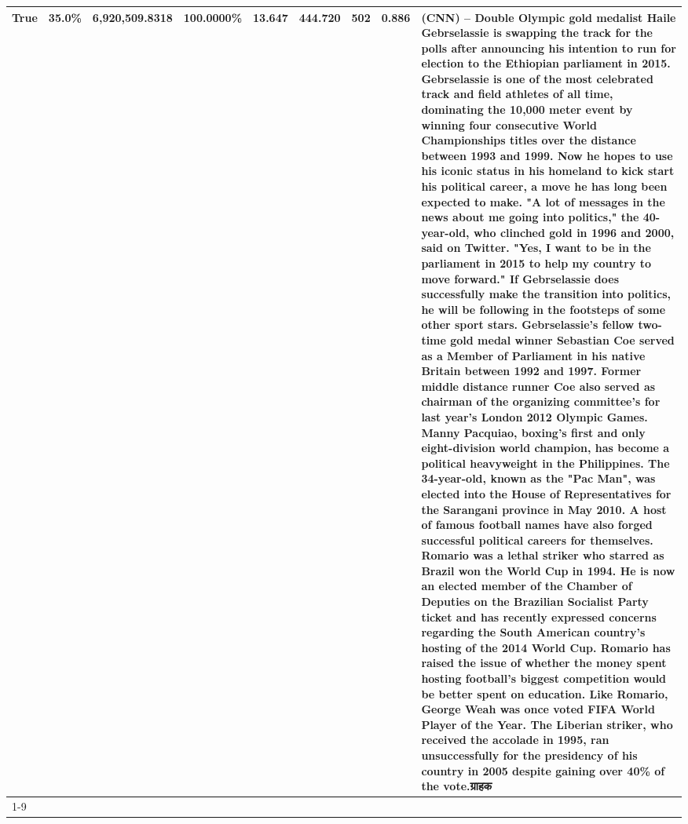 \begin{table}[H]
{\begin{tabular}{lllrlllll}
True & 35.0\% & 6,920,509.8318 & \bfseries \color{red} 100.0000\% & 13.647 & 444.720 & 502 & 0.886 & (CNN) -- Double Olympic gold medalist Haile Gebrselassie is swapping the track for the polls after announcing his intention to run for election to the Ethiopian parliament in 2015. Gebrselassie is one of the most celebrated track and field athletes of all time, dominating the 10,000 meter event by winning four consecutive World Championships titles over the distance between 1993 and 1999. Now he hopes to use his iconic status in his homeland to kick start his political career, a move he has long been expected to make. "A lot of messages in the news about me going into politics," the 40-year-old, who clinched gold in 1996 and 2000, said on Twitter. "Yes, I want to be in the parliament in 2015 to help my country to move forward." If Gebrselassie does successfully make the transition into politics, he will be following in the footsteps of some other sport stars. Gebrselassie's fellow two-time gold medal winner Sebastian Coe served as a Member of Parliament in his native Britain between 1992 and 1997. Former middle distance runner Coe also served as chairman of the organizing committee's for last year's London 2012 Olympic Games. Manny Pacquiao, boxing's first and only eight-division world champion, has become a political heavyweight in the Philippines. The 34-year-old, known as the "Pac Man", was elected into the House of Representatives for the Sarangani province in May 2010. A host of famous football names have also forged successful political careers for themselves. Romario was a lethal striker who starred as Brazil won the World Cup in 1994. He is now an elected member of the Chamber of Deputies on the Brazilian Socialist Party ticket and has recently expressed concerns regarding the South American country's hosting of the 2014 World Cup. Romario has raised the issue of whether the money spent hosting football's biggest competition would be better spent on education. Like Romario, George Weah was once voted FIFA World Player of the Year. The Liberian striker, who received the accolade in 1995, ran unsuccessfully for the presidency of his country in 2005 despite gaining over 40\% of the vote.ग्राहक \\
\cline{1-9}

\end{tabular}}
\end{table}
